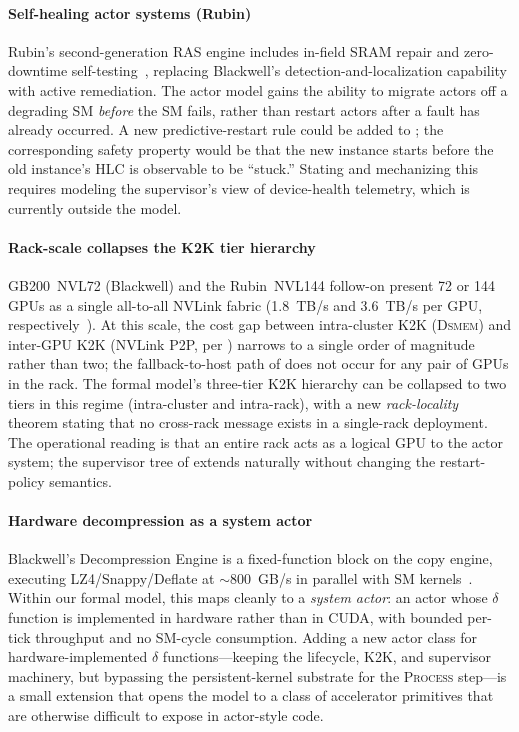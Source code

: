 \paragraph{Self-healing actor systems (Rubin)}
Rubin's second-generation RAS engine includes in-field SRAM repair
and zero-downtime self-testing~\citep{nvidia2025rubin}, replacing
Blackwell's detection-and-localization capability with active
remediation.  The actor model gains the ability to migrate
actors off a degrading SM \emph{before} the SM fails, rather than
restart actors after a fault has already occurred.  A new
predictive-restart rule could be added to
; the corresponding safety
property would be that the new instance starts before the old
instance's HLC is observable to be ``stuck.''  Stating and
mechanizing this requires modeling the supervisor's view of
device-health telemetry, which is currently outside the model.

\paragraph{Rack-scale collapses the K2K tier hierarchy}
GB200~NVL72 (Blackwell) and the Rubin~NVL144 follow-on present 72
or 144 GPUs as a single all-to-all NVLink fabric (1.8~TB/s and
3.6~TB/s per GPU, respectively~\citep{nvidia2024gb200,%
nvidia2025rubin}).  At this scale, the cost gap between intra-cluster
K2K (\textsc{Dsmem}) and inter-GPU K2K (NVLink P2P, per
) narrows to a single order of
magnitude rather than two; the fallback-to-host path of
 does not occur for any pair of
GPUs in the rack.  The formal model's three-tier K2K hierarchy can
be collapsed to two tiers in this regime (intra-cluster and
intra-rack), with a new \emph{rack-locality} theorem stating that
no cross-rack message exists in a single-rack deployment.  The
operational reading is that an entire rack acts as a logical GPU
to the actor system; the supervisor tree of
 extends naturally without changing the
restart-policy semantics.

\paragraph{Hardware decompression as a system actor}
Blackwell's Decompression Engine is a fixed-function block on the
copy engine, executing LZ4/Snappy/Deflate at $\sim$800~GB/s in
parallel with SM kernels~\citep{nvidia2024decomp}.  Within our
formal model, this maps cleanly to a \emph{system actor}: an actor
whose \(\delta\) function is implemented in hardware rather than
in CUDA, with bounded per-tick throughput and no SM-cycle
consumption.  Adding a new actor class for hardware-implemented
\(\delta\) functions—keeping the lifecycle, K2K, and supervisor
machinery, but bypassing the persistent-kernel substrate for the
\textsc{Process} step—is a small extension that opens the model to
a class of accelerator primitives that are otherwise difficult to
expose in actor-style code.

